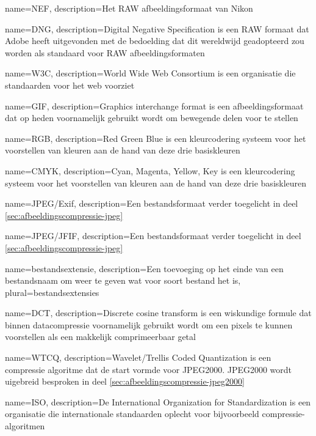 {
	name={NEF},
	description={Het RAW afbeeldingsformaat van Nikon}
}

{
	name={DNG},
	description={Digital Negative Specification is een RAW formaat dat Adobe heeft uitgevonden met de bedoelding dat dit wereldwijd geadopteerd zou worden als standaard voor RAW afbeeldingsformaten}
}

{
	name={W3C},
	description={World Wide Web Consortium is een organisatie die standaarden voor het web voorziet}
}

{
	name={GIF},
	description={Graphics interchange format is een afbeeldingsformaat dat op heden voornamelijk gebruikt wordt om bewegende delen voor te stellen}
}

{
	name={RGB},
	description={Red Green Blue is een kleurcodering systeem voor het voorstellen van kleuren aan de hand van deze drie basiskleuren}
}

{
	name={CMYK},
	description={Cyan, Magenta, Yellow, Key is een kleurcodering systeem voor het voorstellen van kleuren aan de hand van deze drie basiskleuren}
}

{
	name={JPEG/Exif},
	description={Een bestandsformaat verder toegelicht in deel \ref{sec:afbeeldingscompressie-jpeg}}
}

{
	name={JPEG/JFIF},
	description={Een bestandsformaat verder toegelicht in deel \ref{sec:afbeeldingscompressie-jpeg}}
}

{
	name={bestandsextensie},
	description={Een toevoeging op het einde van een bestandsnaam om weer te geven wat voor soort bestand het is},
	plural={bestandsextensies}
}

{
	name={DCT},
	description={Discrete cosine transform is een wiskundige formule dat binnen datacompressie voornamelijk gebruikt wordt om een pixels te kunnen voorstellen als een makkelijk comprimeerbaar getal}
}

{
	name={WTCQ},
	description={Wavelet/Trellis Coded Quantization is een compressie algoritme dat de start vormde voor JPEG2000. JPEG2000 wordt uigebreid besproken in deel \ref{sec:afbeeldingscompressie-jpeg2000}}
}

{
	name={ISO},
	description={De International Organization for Standardization is een organisatie die internationale standaarden oplecht voor bijvoorbeeld compressie-algoritmen}
}

